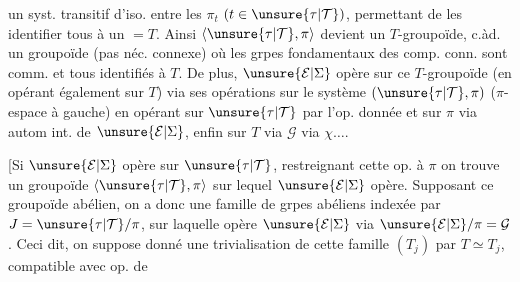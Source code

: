 un syst. transitif d'iso. entre les $\pi_t$ $(t\in\unsure{\tau|\mathcal T})$, permettant de les identifier tous à un $=T$. Ainsi $\langle\unsure{\tau|\mathcal T},\pi\rangle$ devient un $T$-groupoïde, c.àd. un groupoïde (pas néc. connexe) où les grpes fondamentaux des comp. conn. sont comm. et tous identifiés à $T$.
De plus, $\unsure{\mathcal E|\Sigma}$ opère sur ce $T$-groupoïde (en opérant également sur $T$) via ses opérations sur le système $(\unsure{\tau|\mathcal T},\pi)$ ($\pi$-espace à gauche) en opérant sur $\unsure{\tau|\mathcal T}$ par l'op. donnée et sur $\pi$ via autom int. de $\unsure{\mathcal E|\Sigma}$, enfin sur $T$ via $\mathcal G$ via $\chi\ldots.$

[Si $\unsure{\mathcal E|\Sigma}$ opère sur $\unsure{\tau|\mathcal T}$, restreignant cette op. à $\pi$ on trouve un groupoïde $\langle\unsure{\tau|\mathcal T},\pi\rangle$ sur lequel $\unsure{\mathcal E|\Sigma}$ opère. Supposant ce groupoïde abélien, on a donc une famille de grpes abéliens  indexée par $J=\unsure{\tau|\mathcal T}/\pi$, sur laquelle opère $\unsure{\mathcal E|\Sigma}$ via $\unsure{\mathcal E|\Sigma}/\pi=\mathcal G$. Ceci dit, on suppose donné une trivialisation de cette famille $(T_j)$ par $T\simeq T_j$, compatible avec op. de
